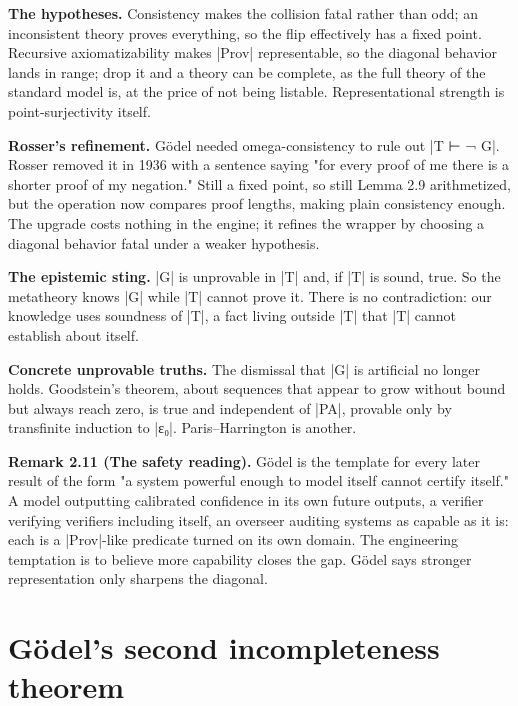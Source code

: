 \documentclass{memoir}
\begin{document}
\textbf{The hypotheses.} Consistency makes the collision fatal rather than odd; an
inconsistent theory proves everything, so the flip effectively has a fixed
point. Recursive axiomatizability makes \LeanVerb|Prov| representable, so the diagonal
behavior lands in range; drop it and a theory can be complete, as the full
theory of the standard model is, at the price of not being listable.
Representational strength is point-surjectivity itself.

\textbf{Rosser's refinement.} Gödel needed omega-consistency to rule out \LeanVerb|T ⊢ ¬ G|.
Rosser removed it in 1936 with a sentence saying "for every proof of me there is
a shorter proof of my negation." Still a fixed point, so still Lemma 2.9
arithmetized, but the operation now compares proof lengths, making plain
consistency enough. The upgrade costs nothing in the engine; it refines the
wrapper by choosing a diagonal behavior fatal under a weaker hypothesis.

\textbf{The epistemic sting.} \LeanVerb|G| is unprovable in \LeanVerb|T| and, if \LeanVerb|T| is sound, true. So
the metatheory knows \LeanVerb|G| while \LeanVerb|T| cannot prove it. There is no contradiction:
our knowledge uses soundness of \LeanVerb|T|, a fact living outside \LeanVerb|T| that \LeanVerb|T| cannot
establish about itself.

\textbf{Concrete unprovable truths.} The dismissal that \LeanVerb|G| is artificial no longer
holds. Goodstein's theorem, about sequences that appear to grow without bound
but always reach zero, is true and independent of \LeanVerb|PA|, provable only by
transfinite induction to \LeanVerb|ε₀|. Paris–Harrington is another.

\textbf{Remark 2.11 (The safety reading).} Gödel is the template for every later result of
the form "a system powerful enough to model itself cannot certify itself." A
model outputting calibrated confidence in its own future outputs, a verifier
verifying verifiers including itself, an overseer auditing systems as capable as
it is: each is a \LeanVerb|Prov|-like predicate turned on its own domain. The engineering
temptation is to believe more capability closes the gap. Gödel says stronger
representation only sharpens the diagonal.



\section{Gödel's second incompleteness theorem}\label{Two--Schemas--of--Impossibility-005F-005F-005F--Machine--Checked--Limits--of--Trustworthy--Machine--Learning-005F-005F-005F--and--Why--They--Tighten--with--Capability----The--Classical--Limits----G-005F-005F-005Fdel-005F-005F-005Fs--second--incompleteness--theorem}
\end{document}

